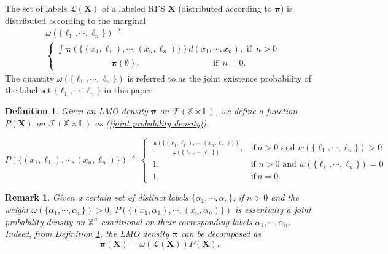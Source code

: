 \documentclass[journal]{IEEEtran}
\newcommand{\bX}{{\mathbf X}}
\newcommand{\bpi}{{\boldsymbol\pi}}
\newtheorem{Def}{Definition}
\newtheorem{Rem}{Remark}
\begin{document}
The set of labels $\mathcal{L}(\bX)$ of a labeled RFS $\bX$ (distributed according to $\bpi$) is distributed according to the marginal
\begin{equation}
\begin{split}\label{joint existence probability}
 &\omega(\{\ell_1,\!\cdots\!,\ell_n\})\triangleq\\&
  \!\!\!\!\!\!\left\{\begin{array}{l}
\!\!\! \int \bpi(\{(x_1,\ell_1),\!\cdots\!,(x_n,\ell_n)\})d(x_1,\!\cdots\!,x_n), 
\,\,\mbox{if}\,\,\,n>0\\
\,\,\,\,\,\,\,\,\,\,\,\,\,\,\,\,\,\,\,\,\,\,\,\,\,\,\,\,\,\,\,\,\,\,\,\,\,\,\bpi(\emptyset),\,\,\,\,\,\,\,\,\,\,\,\,\,\,\,\,\,\,\,\,\,\,\,\,\,\,\,\,\,\,\,\,\,\,\,\,\,\,\,\,\,\,\,\,\,\,\,\,\,\,\,\mbox{if}\,\,\,n=0.
\end{array}\right.
\end{split}
\end{equation}
The quantity $\omega(\{\ell_{1},\cdots,\ell_{n}\})$ is referred to as the joint existence probability of the label set $\{\ell_{1},\cdots,\ell_{n}\}$ in this paper.
\begin{Def}\label{definition:1}
Given an LMO density $\bpi$ on $\mathcal{F}(\mathbb{X}\times\mathbb{L})$, we define a function $P(\bX)$ on $\mathcal{F}(\mathbb{X}\times\mathbb{L})$ as (\ref{joint probability density}).
\begin{figure*}
\begin{equation}
\label{joint probability density}
 P(\{(x_1,\ell_1),\cdots,(x_n,\ell_n)\})\triangleq
  \left\{
 \begin{array}{cl}
\ \frac{\bpi(\{(x_1,\ell_1),\cdots,(x_n,\ell_n)\})}{\omega(\{\ell_1,\cdots,\ell_n\})},  &\mbox{if}\,n>0\,\,\mbox{and}\,\, w(\{\ell_{1},\cdots,\ell_{n}\})>0\\
\ 1,                                                                                                                       & \mbox{if}\,\,n>0\,\, \mbox{and}\,\,w(\{\ell_{1},\cdots,\ell_{n}\})=0\\
\ 1,                                                                                                                       &\mbox{if}\,n=0.
\end{array}
\right.
\end{equation}
\hrulefill
\end{figure*}

\end{Def}
\begin{Rem}\label{remark:1}
Given a certain  set of distinct labels $\{\alpha_1,\cdots,\alpha_n\}$, if $n>0$ and  the weight $\omega(\{\alpha_1,\cdots,\alpha_n\})>0$, $P(\{(x_1,\alpha_1),\cdots,(x_n,\alpha_n)\})$ is essentially a joint probability density on $\mathbb{X}^{n}$ conditional on their corresponding labels $\alpha_{1},\cdots,\alpha_{n}$. Indeed, from Definition \ref{definition:1}, the LMO density $\bpi$ can be decomposed as 
 \begin{equation}\label{P-LMO}
  \bpi(\mathbf{X})=\omega(\mathcal{L}(\mathbf{X}))P(\mathbf{X}).
\end{equation}
\end{Rem}
\end{document}
